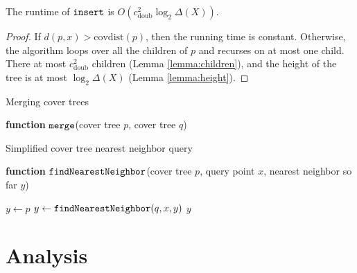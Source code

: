 \documentclass[../main.tex]{subfiles}
\newcommand{\dist}[2]{\distf({#1},{#2})}
\newcommand{\distf}{d}
\newcommand{\aspect}[1]{\Delta({#1})}
\newcommand{\doubnum}{c_\text{doub}}
\newcommand{\mkfunction}[1]{\ensuremath{\text{{#1}}}}
\newcommand{\level}[1]      {\mkfunction{level}({#1})}
\newcommand{\covdist}[1]    {\mkfunction{covdist}({#1})}
\newcommand{\maxdist}[1]    {\mkfunction{maxdist}({#1})}
\newcommand{\findnn}{\ensuremath{\text{\ttfamily findNearestNeighbor}}}
\newcommand{\ctmerge}{\ensuremath{\text{\ttfamily merge}}}
\newcommand{\ctinsert}{\ensuremath{\textnormal{\ttfamily insert}}}
\begin{document}
\begin{theorem}
    The runtime of $\ctinsert$ is $O(\doubnum^2\log_2\aspect{X})$.
\end{theorem}
\begin{proof}
    If $\dist{p}{x} > \covdist{p}$, then the running time is constant.
    Otherwise, the algorithm loops over all the children of $p$ and recurses on at most one child.
    There at most $\doubnum^2$ children (Lemma \ref{lemma:children}),
    and the height of the tree is at most $\log_2\aspect{X}$ (Lemma \ref{lemma:height}).
\end{proof}


\begin{algorithm}[H]
    \caption{Merging cover trees}
    \label{alg:merge}
    \vspace{0.1in}
    {\bfseries function} \ctmerge(cover tree $p$, cover tree $q$)

\begin{algorithmic}[1]
\end{algorithmic}
\end{algorithm}



\begin{algorithm}[H]
    \caption{Simplified cover tree nearest neighbor query}
    \label{alg:query}

    \vspace{0.1in}
{\bfseries function} \findnn(cover tree $p$, query  point $x$, nearest neighbor so far $y$)

\begin{algorithmic}[1]
        \State $y \leftarrow p$
    \EndIf
        \If {$d(y,x) > d(y,q) - \maxdist{q}$} %
            \State $y \leftarrow \findnn(q,x,y)$
        \EndIf
    \EndFor
    \State\Return $y$
\end{algorithmic}
\end{algorithm}



\section{Analysis}
\end{document}
